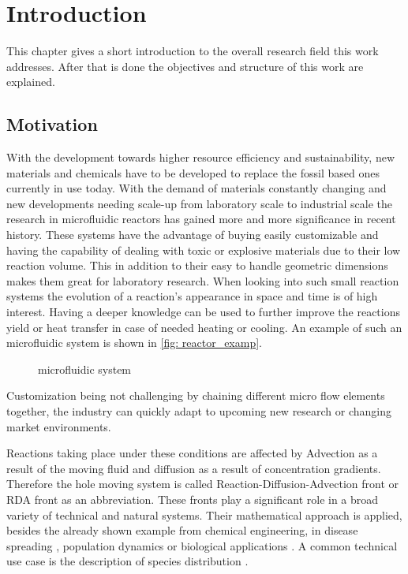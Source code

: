 \documentclass[../thesis.tex]{subfiles}
\begin{document}
\chapter{Introduction}
\label{chp:introduction}

This chapter gives a short introduction to the overall research field this work addresses. After that is done the objectives and structure of this work are explained.

\section{Motivation}

With the development towards higher resource efficiency and sustainability, new materials and chemicals have to be developed to replace the fossil based ones currently in use today. With the demand of materials constantly changing and new developments needing scale-up from laboratory scale to industrial scale the research in microfluidic reactors has gained more and more significance in recent history. These systems have the advantage of buying easily customizable and having the capability of dealing with toxic or explosive materials due to their low reaction volume. This in addition to their easy to handle geometric dimensions makes them great for laboratory research. When looking into such small reaction systems the evolution of a reaction's appearance in space and time is of high interest. Having a deeper knowledge can be used to further improve the reactions yield or heat transfer in case of needed heating or cooling. An example of such an microfluidic system is shown in \autoref{fig: reactor_examp}. 
\begin{figure}[htb]
	\centering
	\qquad
	\caption{microfluidic system \cite{corning}}%
	\label{fig: reactor_examp}%
\end{figure}
Customization being not challenging by chaining different micro flow elements together, the industry can quickly adapt to upcoming new research or changing market environments.

Reactions taking place under these conditions are affected by Advection as a result of the moving fluid and diffusion as a result of concentration gradients. Therefore the hole moving system is called Reaction-Diffusion-Advection front or RDA front as an abbreviation.
These fronts play a significant role in a broad variety of technical and natural systems. Their mathematical approach is applied, besides the already shown example from chemical engineering, in disease spreading \cite{kuto2017concentration}, population dynamics \cite{chen2018hopf, wang2019persistence} or biological applications \cite{zhao2011operator}. A common technical use case is the description of species distribution \cite{nakagaki1999reaction, von2013measurement}.
\end{document}
